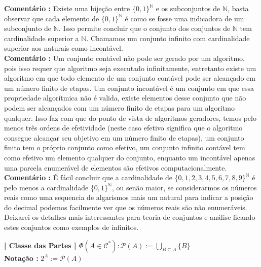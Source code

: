 \documentclass[10pt,a4paper]{report}
\begin{document}
\textbf{Comentário :} Existe uma bijeção entre $\{0,1\}^{ \mathbb{N} }$ e os subconjuntos de $\mathbb{N}$, basta observar que cada elemento de $ \{0,1\}^{\mathbb{N}} $ é como se fosse uma indicadora de um subconjunto de $\mathbb{N}$. Isso permite concluir que o conjunto dos conjuntos de $\mathbb{N}$ tem cardinalidade superior a $\mathbb{N}$. Chamamos um conjunto infinito com cardinalidade superior aos naturais como incontável. \\

\textbf{Comentário :} Um conjunto contável não pode ser gerado por um algoritmo, pois isso requer que algoritmo seja executado infinitamente, entretanto existe um algoritmo em que todo elemento de um conjunto contável pode ser alcançado em um número finito de etapas. Um conjunto incontável é um conjunto em que essa propriedade algorítmica não é valida, existe elementos desse conjunto que não podem ser alcançados com um número finito de etapas para um algoritmo qualquer. Isso faz com que do ponto de vista de algoritmos geradores, temos pelo menos três ordens de efetividade (neste caso efetivo significa que o algoritmo consegue alcançar seu objetivo em um número finito de etapas), um conjunto finito tem o próprio conjunto como efetivo, um conjunto infinito contável tem como efetivo um elemento qualquer do conjunto, enquanto um incontável apenas uma parcela enumerável de elementos são efetivos computacionalmente.\\

\textbf{Comentário :} É fácil concluir que a cardinalidade de $ \{ 0,1,2,3,4,5,6,7,8,9 \}^{ \mathbb{N} } $ é pelo menos a cardinalidade $ \{0,1\}^{ \mathbb{N} } $, ou senão maior, se considerarmos os números reais como uma sequencia de algarismos mais um natural para indicar a posição do decimal podemos facilmente ver que os números reais são não enumeráveis. Deixarei os detalhes mais interessantes para teoria de conjuntos e análise ficando estes conjuntos como exemplos de infinitos.

\hspace{\baselineskip}

\textbf{[ Classe das Partes ]} $ \Phi( A \in \mathcal{C}^* ) : \mathcal{P}(A) := \bigcup\limits_{ B \subseteq A } \{B\} $\\

\textbf{Notação :} $2^A := \mathcal{P}(A)$

\hspace{\baselineskip}
\end{document}
